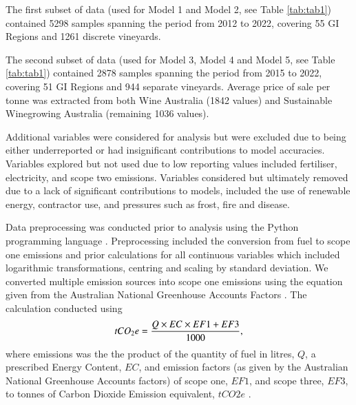 \documentclass[review,12pt,authoryear]{elsarticle}
\begin{document}
\begin{linenumbers}
\par
The first subset of data (used for Model 1 and Model 2, see Table \ref{tab:tab1}) contained 5298 samples spanning the period from 2012 to 2022, covering 55 GI Regions and 1261 discrete vineyards.
\par
The second subset of data (used for Model 3, Model 4 and Model 5, see Table \ref{tab:tab1}) contained 2878 samples spanning the period from 2015 to 2022, covering 51 GI Regions and 944 separate vineyards. Average price of sale per tonne was extracted from both Wine Australia (1842 values) and Sustainable Winegrowing Australia (remaining 1036 values).
\par
Additional variables were considered for analysis but were excluded due to being either underreported or had insignificant contributions to model accuracies. Variables explored but not used due to low reporting values included fertiliser, electricity, and scope two emissions. Variables considered but ultimately removed due to a lack of significant contributions to models, included the use of renewable energy, contractor use, and pressures such as frost, fire and disease.
\par
Data preprocessing was conducted prior to analysis using the Python programming language \citep{g.vanrossumPythonTutorialTechnical1995}. Preprocessing included the conversion from fuel to scope one emissions and prior calculations for all continuous variables which included logarithmic transformations, centring and scaling by standard deviation. 
We converted multiple emission sources into scope one emissions using the equation given from the Australian National Greenhouse Accounts Factors \citep{agdeeNationalGreenhouseAccounts2021}. The calculation conducted using
\begin{equation}
\label{(1)}
    tCO_{2}e={{Q \times EC \times EF1 + EF3}\over{1000}},
\end{equation}
where emissions was the the product of the quantity of fuel in litres, $Q$, a prescribed Energy Content, $EC$, and emission factors (as given by the Australian National Greenhouse Accounts factors) of scope one, $EF1$, and scope three, $EF3$, to tonnes of Carbon Dioxide Emission equivalent, $tCO2e$ \citep{departmentofclimatechangeenergytheenvironmentandwaterAustralianNationalGreenhouse2022}.
\par
\begin{figure}
  \resizebox{\textwidth}{!}{
}
\end{figure}
\end{linenumbers}
\end{document}
